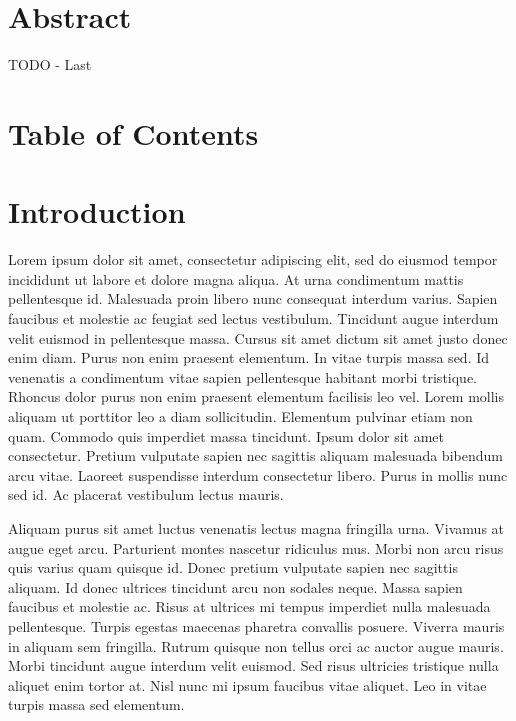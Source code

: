 \documentclass{article}
\begin{document}
  
  \graphicspath{{./images/}}
  \section*{Abstract}
  TODO - Last
  \newpage
  \section*{Table of Contents}
  \tableofcontents
  \newpage
  \section{Introduction}
Lorem ipsum dolor sit amet, consectetur adipiscing elit, sed do eiusmod tempor incididunt ut labore et dolore magna aliqua. At urna condimentum mattis pellentesque id. Malesuada proin libero nunc consequat interdum varius. Sapien faucibus et molestie ac feugiat sed lectus vestibulum. Tincidunt augue interdum velit euismod in pellentesque massa. Cursus sit amet dictum sit amet justo donec enim diam. Purus non enim praesent elementum. In vitae turpis massa sed. Id venenatis a condimentum vitae sapien pellentesque habitant morbi tristique. Rhoncus dolor purus non enim praesent elementum facilisis leo vel. Lorem mollis aliquam ut porttitor leo a diam sollicitudin. Elementum pulvinar etiam non quam. Commodo quis imperdiet massa tincidunt. Ipsum dolor sit amet consectetur. Pretium vulputate sapien nec sagittis aliquam malesuada bibendum arcu vitae. Laoreet suspendisse interdum consectetur libero. Purus in mollis nunc sed id. Ac placerat vestibulum lectus mauris.

Aliquam purus sit amet luctus venenatis lectus magna fringilla urna. Vivamus at augue eget arcu. Parturient montes nascetur ridiculus mus. Morbi non arcu risus quis varius quam quisque id. Donec pretium vulputate sapien nec sagittis aliquam. Id donec ultrices tincidunt arcu non sodales neque. Massa sapien faucibus et molestie ac. Risus at ultrices mi tempus imperdiet nulla malesuada pellentesque. Turpis egestas maecenas pharetra convallis posuere. Viverra mauris in aliquam sem fringilla. Rutrum quisque non tellus orci ac auctor augue mauris. Morbi tincidunt augue interdum velit euismod. Sed risus ultricies tristique nulla aliquet enim tortor at. Nisl nunc mi ipsum faucibus vitae aliquet. Leo in vitae turpis massa sed elementum.
\end{document}
